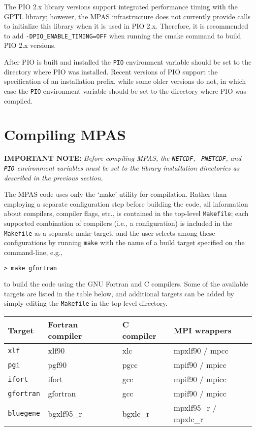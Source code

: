 The PIO 2.x library versions support integrated performance timing with the GPTL library; however,
the MPAS infrastructure does not currently provide calls to initialize this library when it is used in PIO 2.x.
Therefore, it is recommended to add {\tt -DPIO\_ENABLE\_TIMING=OFF} when running the cmake command
to build PIO 2.x versions.

After PIO is built and installed the {\tt PIO} environment variable should be set to 
the directory where PIO was installed. Recent versions of PIO support the specification of an installation
prefix, while some older versions do not, in which case the {\tt PIO} environment variable should
be set to the directory where PIO was compiled.

\section{Compiling MPAS}
\label{compiling_MPAS}

{\bf IMPORTANT NOTE:} {\em Before compiling MPAS, the {\tt NETCDF}, {\tt
PNETCDF}, and {\tt PIO} environment variables must be set to the library
installation directories as described in the previous section.} \vspace{12pt}

The MPAS code uses only the `make' utility for compilation. Rather than
employing a separate configuration step before building the code, all
information about compilers, compiler flags, etc., is contained in the top-level
{\tt Makefile}; each supported combination of compilers (i.e., a configuration)
is included in the {\tt Makefile} as a separate make target, and the user
selects among these configurations by running {\tt make} with the name of a
build target specified on the command-line, e.g.,

\vspace{12pt}
{\tt > make gfortran}
\vspace{12pt}

\noindent to build the code using the GNU Fortran and C compilers. Some of the
available targets are listed in the table below, and additional targets can be
added by simply editing the {\tt Makefile} in the top-level directory.

\vspace{12pt}
\begin{longtable}{| l | l | l | l |}
\hline
Target & Fortran compiler & C compiler & MPI wrappers \\ \hline \hline
{\tt xlf} & xlf90 & xlc & mpxlf90 / mpcc \\ \hline
{\tt pgi} & pgf90 & pgcc & mpif90 / mpicc \\ \hline
{\tt ifort} & ifort & gcc & mpif90 / mpicc \\ \hline
{\tt gfortran} & gfortran & gcc & mpif90 / mpicc \\ \hline
{\tt bluegene} & bgxlf95\_r & bgxlc\_r & mpxlf95\_r / mpxlc\_r \\ \hline
\end{longtable}
\vspace{12pt}

